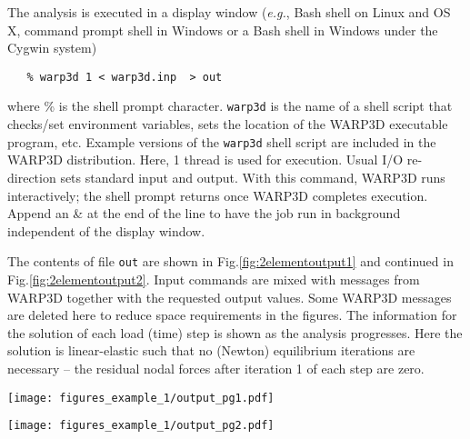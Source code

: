 \documentclass[11pt]{report}
\numberwithin{equation}{section}
\newcommand{\ttt} {\texttt}  %
\newcommand{\eg}{\emph{e.g.},\xspace}
\newcommand{\Fig}{{Fig.}\xspace}
\newcommand{\nid}{\noindent}
\renewcommand{\thefigure}{\thesection.\arabic{figure}}
\begin{document}
{The analysis is executed in a display window (\eg Bash shell on Linux and OS X, command prompt shell in
Windows or a Bash shell in Windows under the Cygwin system)
%
\begin{verbatim}
   % warp3d 1 < warp3d.inp  > out
\end{verbatim}  
%
\nid where \% is the shell prompt character. \ttt{warp3d} is the name of a 
shell script that checks/set environment variables,
sets the location of the WARP3D executable program, etc. Example versions of the \ttt{warp3d}
shell script are included in the WARP3D distribution. Here, 1 thread is used for execution. Usual
I/O re-direction sets standard input and output. With this command, WARP3D runs
interactively; the shell prompt returns once WARP3D completes execution. Append an
\& at the end of the line to have the job run in background independent of the display window.

The contents of file \ttt{out} are shown in \Fig \ref{fig:2elementoutput1} and 
continued in \Fig\ref{fig:2elementoutput2}. Input commands are mixed with messages
from WARP3D together with the requested output values. Some WARP3D messages are 
deleted here to reduce space requirements in the figures. The information for the solution of
each load (time) step is shown as the analysis progresses. Here the solution is linear-elastic such
that no (Newton) equilibrium iterations are necessary  -- the residual nodal forces after iteration 1
of each step are zero.

%
\begin{sidewaysfigure}
\begin{center}
\texttt{[image: figures\_example\_1/output\_pg1.pdf]} 
\caption{{\small Fig. \thefigure\ Output for 2 element example problem. 
Some non-essential lines are deleted and
replaced with ... for clarity}
\label{fig:2elementoutput1}}
%
\end{center}
\end{sidewaysfigure}
%
%
\begin{sidewaysfigure}
\begin{center}
\texttt{[image: figures\_example\_1/output\_pg2.pdf]} 
\caption{{\small Fig. \thefigure\ Continuation of output
 for 2 element example problem. Some non-essential lines are deleted and
replaced with ... for clarity}
\label{fig:2elementoutput2}}
%
\end{center}
\end{sidewaysfigure}
%


}
\end{document}
